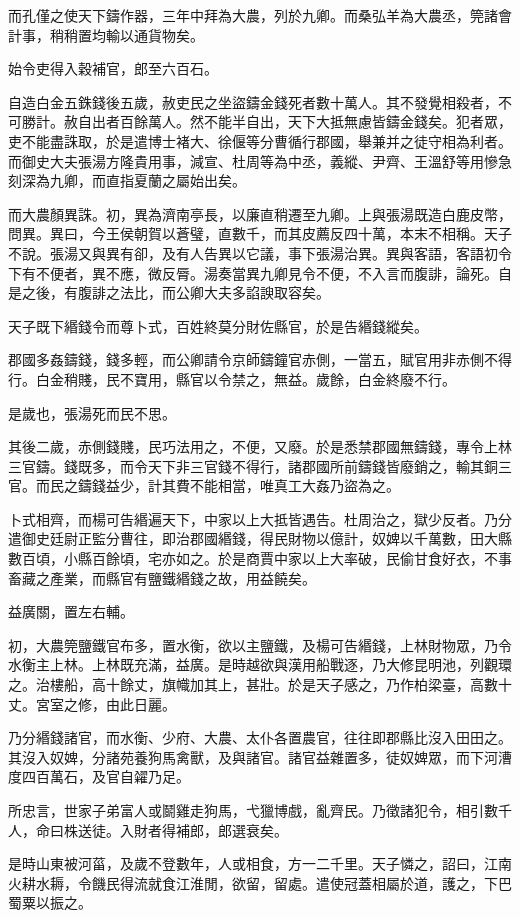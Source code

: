 而孔僅之使天下鑄作器，三年中拜為大農，列於九卿。而桑弘羊為大農丞，筦諸會計事，稍稍置均輸以通貨物矣。

始令吏得入穀補官，郎至六百石。

自造白金五銖錢後五歲，赦吏民之坐盜鑄金錢死者數十萬人。其不發覺相殺者，不可勝計。赦自出者百餘萬人。然不能半自出，天下大抵無慮皆鑄金錢矣。犯者眾，吏不能盡誅取，於是遣博士褚大、徐偃等分曹循行郡國，舉兼并之徒守相為利者。而御史大夫張湯方隆貴用事，減宣、杜周等為中丞，義縱、尹齊、王溫舒等用慘急刻深為九卿，而直指夏蘭之屬始出矣。

而大農顏異誅。初，異為濟南亭長，以廉直稍遷至九卿。上與張湯既造白鹿皮幣，問異。異曰，今王侯朝賀以蒼璧，直數千，而其皮薦反四十萬，本末不相稱。天子不說。張湯又與異有卻，及有人告異以它議，事下張湯治異。異與客語，客語初令下有不便者，異不應，微反脣。湯奏當異九卿見令不便，不入言而腹誹，論死。自是之後，有腹誹之法比，而公卿大夫多諂諛取容矣。

天子既下緡錢令而尊卜式，百姓終莫分財佐縣官，於是告緡錢縱矣。

郡國多姦鑄錢，錢多輕，而公卿請令京師鑄鐘官赤側，一當五，賦官用非赤側不得行。白金稍賤，民不寶用，縣官以令禁之，無益。歲餘，白金終廢不行。

是歲也，張湯死而民不思。

其後二歲，赤側錢賤，民巧法用之，不便，又廢。於是悉禁郡國無鑄錢，專令上林三官鑄。錢既多，而令天下非三官錢不得行，諸郡國所前鑄錢皆廢銷之，輸其銅三官。而民之鑄錢益少，計其費不能相當，唯真工大姦乃盜為之。

卜式相齊，而楊可告緡遍天下，中家以上大抵皆遇告。杜周治之，獄少反者。乃分遣御史廷尉正監分曹往，即治郡國緡錢，得民財物以億計，奴婢以千萬數，田大縣數百頃，小縣百餘頃，宅亦如之。於是商賈中家以上大率破，民偷甘食好衣，不事畜藏之產業，而縣官有鹽鐵緡錢之故，用益饒矣。

益廣關，置左右輔。

初，大農筦鹽鐵官布多，置水衡，欲以主鹽鐵，及楊可告緡錢，上林財物眾，乃令水衡主上林。上林既充滿，益廣。是時越欲與漢用船戰逐，乃大修昆明池，列觀環之。治樓船，高十餘丈，旗幟加其上，甚壯。於是天子感之，乃作柏梁臺，高數十丈。宮室之修，由此日麗。

乃分緡錢諸官，而水衡、少府、大農、太仆各置農官，往往即郡縣比沒入田田之。其沒入奴婢，分諸苑養狗馬禽獸，及與諸官。諸官益雜置多，徒奴婢眾，而下河漕度四百萬石，及官自糴乃足。

所忠言，世家子弟富人或鬬雞走狗馬，弋獵博戲，亂齊民。乃徵諸犯令，相引數千人，命曰株送徒。入財者得補郎，郎選衰矣。

是時山東被河菑，及歲不登數年，人或相食，方一二千里。天子憐之，詔曰，江南火耕水耨，令饑民得流就食江淮閒，欲留，留處。遣使冠蓋相屬於道，護之，下巴蜀粟以振之。


